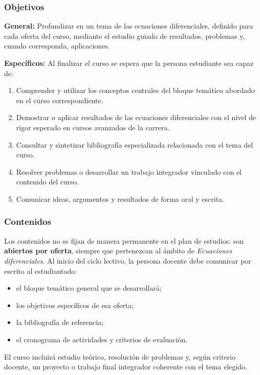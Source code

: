 \begin{refsection}
\subsubsection*{Objetivos}

\textbf{General:} Profundizar en un tema de las ecuaciones diferenciales, definido para cada oferta del curso, mediante el estudio guiado de resultados, problemas y, cuando corresponda, aplicaciones.

\textbf{Específicos:} Al finalizar el curso se espera que la persona estudiante sea capaz de:

\begin{enumerate}
\item Comprender y utilizar los conceptos centrales del bloque temático abordado en el curso correspondiente.
\item Demostrar o aplicar resultados de las ecuaciones diferenciales con el nivel de rigor esperado en cursos avanzados de la carrera.
\item Consultar y sintetizar bibliografía especializada relacionada con el tema del curso.
\item Resolver problemas o desarrollar un trabajo integrador vinculado con el contenido del curso.
\item Comunicar ideas, argumentos y resultados de forma oral y escrita.
\end{enumerate}

\subsubsection*{Contenidos}

Los contenidos no se fijan de manera permanente en el plan de estudios: son \textbf{abiertos por oferta}, siempre que pertenezcan al ámbito de \emph{Ecuaciones diferenciales}. Al inicio del ciclo lectivo, la persona docente debe comunicar por escrito al estudiantado:

\begin{itemize}
\item el bloque temático general que se desarrollará;
\item los objetivos específicos de esa oferta;
\item la bibliografía de referencia;
\item el cronograma de actividades y criterios de evaluación.
\end{itemize}

El curso incluirá estudio teórico, resolución de problemas y, según criterio docente, un proyecto o trabajo final integrador coherente con el tema elegido.


\end{refsection}
